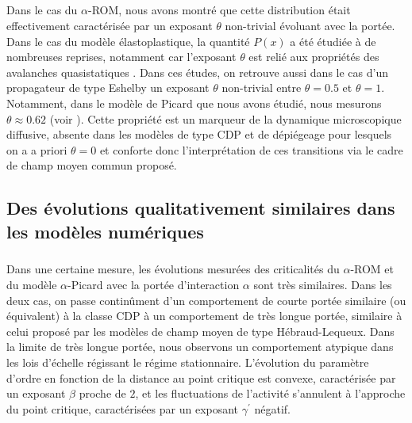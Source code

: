 \subparagraph{}Dans le cas du $\alpha$-ROM, nous avons montré que cette distribution était effectivement caractérisée par un exposant $\theta$ non-trivial évoluant avec la portée. Dans le cas du modèle élastoplastique, la quantité $P(x)$ a été étudiée à de nombreuses reprises, notamment car l'exposant $\theta$ est relié aux propriétés des avalanches quasistatiques \cite{lin_scaling_2014, ferrero_criticality_2019, liu_driving_2016, lin_mean-field_2016}. Dans ces études, on retrouve aussi dans le cas d'un propagateur de type Eshelby un exposant $\theta$ non-trivial entre $\theta = 0.5$ et $\theta = 1$. Notamment, dans le modèle de Picard que nous avons étudié, nous mesurons $\theta \approx 0.62$ (voir ). Cette propriété est un marqueur de la dynamique microscopique diffusive, absente dans les modèles de type CDP et de dépiégeage pour lesquels on a a priori $\theta = 0$ \cite{lin_scaling_2014} et conforte donc l'interprétation de ces transitions via le cadre de champ moyen commun proposé.

\subsection{Des évolutions qualitativement similaires dans les modèles numériques}

\subparagraph{}Dans une certaine mesure, les évolutions mesurées des criticalités du $\alpha$-ROM et du modèle $\alpha$-Picard avec la portée d'interaction $\alpha$ sont très similaires. Dans les deux cas, on passe continûment d'un comportement de courte portée similaire (ou équivalent) à la classe CDP à un comportement de très longue portée, similaire à celui proposé par les modèles de champ moyen de type Hébraud-Lequeux. Dans la limite de très longue portée, nous observons un comportement atypique dans les lois d'échelle régissant le régime stationnaire. L'évolution du paramètre d'ordre en fonction de la distance au point critique est convexe, caractérisée par un exposant $\beta$ proche de $2$, et les fluctuations de l'activité s'annulent à l'approche du point critique, caractérisées par un exposant $\gamma^\prime$ négatif.

